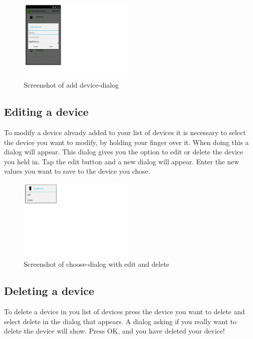 
\begin{figure}[H]
\centering
\includegraphics[width=0.5\textwidth, clip, trim=0cm 4cm 19cm 0cm]{appendix/usermanual/fig/AddDeviceDialog.png}
\caption{Screenshot of add device-dialog}
\end{figure}

\subsection{Editing a device}
To modify a device already added to your list of devices it is necessary to select the device you want to modify, by holding your finger over it. When doing this a dialog will appear. This dialog gives you the option to edit or delete the device you held in. Tap the edit button and a new dialog will appear. Enter the new values you want to save to the device you chose.

\begin{figure}[H]
\centering
\includegraphics[width=0.5\textwidth, clip, trim=0cm 15cm 20cm 0cm]{appendix/usermanual/fig/EditDeviceDialog.png}
\caption{Screenshot of choose-dialog with edit and delete}
\end{figure}

\subsection{Deleting a device}
To delete a device in you list of devices press the device you want to delete and select delete in the dialog that appears. A dialog asking if you really want to delete the device will show. Press OK, and you have deleted your device!

